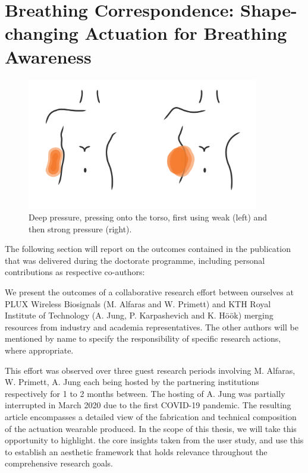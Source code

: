 \section{Breathing Correspondence: Shape-changing Actuation for Breathing Awareness}
\label{case_studies:soma_chi}

\begin{figure}[t]
  \centering
  \includegraphics[width=0.9\textwidth]{Chapters/Figures/soma_chi/deep_pressure_graphic-01.png}
  \caption[Deep pressure, pressing onto the torso]{Deep pressure, pressing onto the torso, first using weak (left) and then strong pressure (right).}
  \label{fig:teaser}
\end{figure}

The following section will report on the outcomes contained in the publication that was delivered during the doctorate programme, including personal contributions as respective co-authors:


We present the outcomes of a collaborative research effort between ourselves at PLUX Wireless Biosignals (M. Alfaras and W. Primett) and KTH Royal Institute of Technology (A. Jung, P. Karpashevich and K. Höök) merging resources from industry and academia representatives. The other authors will be mentioned by name to specify the responsibility of specific research actions, where appropriate.

This effort was observed over three guest research periods involving M. Alfaras, W. Primett, A. Jung each being hosted by the partnering institutions respectively for 1 to 2 months between. The hosting of A. Jung was partially interrupted in March 2020 due to the first COVID-19 pandemic. The resulting article encompasses a detailed view of the fabrication and technical composition of the actuation wearable produced. In the scope of this thesis, we will take this opportunity to highlight. the core insights taken from the user study, and use this to establish an aesthetic framework that holds relevance throughout the comprehensive research goals.

